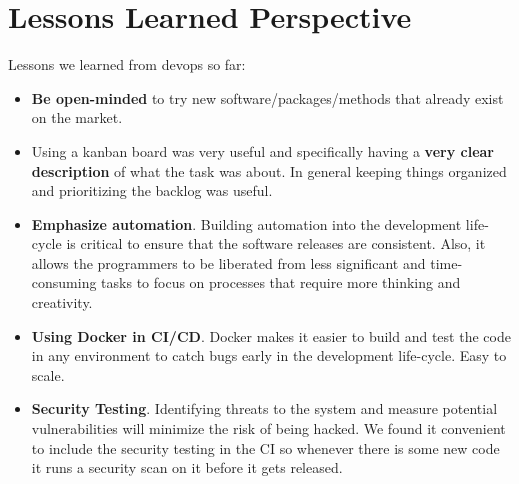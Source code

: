 \documentclass[10pt]{article}
\begin{document}
\section{Lessons Learned Perspective}




Lessons we learned from devops so far: 
\begin{itemize}
\item \textbf{Be open-minded} to try new software/packages/methods that already exist on the market.
\item Using a kanban board was very useful and specifically having a \textbf{very clear description} of what the task was about. In general keeping things organized and prioritizing the backlog was useful.

\item \textbf{Emphasize automation}. Building automation into the development life-cycle is critical to ensure that the software releases are consistent. Also, it allows the programmers to be liberated from less significant and time-consuming tasks to focus on processes that require more thinking and creativity.
\item \textbf{Using Docker in CI/CD}. Docker makes it easier to build and test the code in any environment to catch bugs early in the development life-cycle. Easy to scale.
\item \textbf{Security Testing}. Identifying threats to the system and measure potential vulnerabilities will minimize the risk of being hacked. We found it convenient to include the security testing in the CI so whenever there is some new code it runs a security scan on it before it gets released.
\end{itemize}



\end{document}
